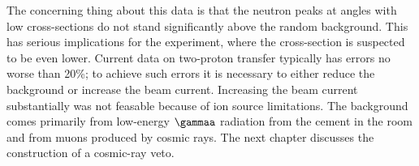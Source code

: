 
The concerning thing about this data is that the neutron peaks at angles with low cross-sections do not stand significantly above the random background.  This has serious implications for the \GeTargets experiment, where the cross-section is suspected to be even lower.  Current data on two-proton transfer typically has errors no worse than 20\%; to achieve such errors it is necessary to either reduce the background or increase the beam current.  Increasing the beam current substantially was not feasable because of ion source limitations.  The background comes primarily from low-energy $\gammaa$ radiation from the cement in the room and from muons produced by cosmic rays.  The next chapter discusses the construction of a cosmic-ray veto.

%
% 
% 
